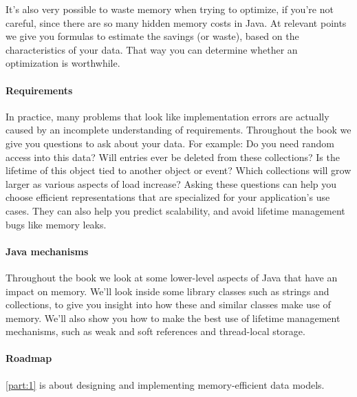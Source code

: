 It's also very possible to waste memory when trying to optimize, if
you're not careful, since there are so many hidden memory costs in Java. At relevant
points we give you formulas to estimate the savings (or waste), based on
the characteristics of your data. That way you can determine whether an
optimization is worthwhile.

\paragraph{Requirements}In practice, many problems that look like implementation
errors are actually caused by an incomplete understanding of requirements. Throughout the book we
give you questions to ask about your data. For example: Do you need random access into this data? Will entries ever be deleted from these collections? Is the lifetime of this object tied to another object or event? Which
collections will grow larger as various aspects of load increase?  Asking these
questions can help you choose efficient representations that are specialized for your application's use cases.
They can also help you predict scalability, and avoid lifetime management bugs
like memory leaks.

\paragraph{Java mechanisms}Throughout the book we look at some
lower-level aspects of Java that have an impact on memory. We'll look
inside some library classes such as strings and collections, to give you insight
into how these and similar classes make use of memory.
We'll also show you how to make the best use of lifetime management mechanisms,
such as weak and soft references and thread-local storage.




\paragraph{Roadmap}\autoref{part:1} is about designing and implementing
memory-efficient data models.

